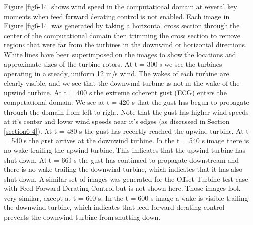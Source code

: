 Figure \ref{fig6-14} shows wind speed in the computational domain at several key moments when feed forward derating control is not enabled. Each image in Figure \ref{fig6-14} was generated by taking a horizontal cross section through the center of the computational domain then trimming the cross section to remove regions that were far from the turbines in the downwind or horizontal directions. White lines have been superimposed on the images to show the locations and approximate sizes of the turbine rotors. At t = 300 s we see the turbines operating in a steady, uniform 12 m/s wind. The wakes of each turbine are clearly visible, and we see that the downwind turbine is not in the wake of the upwind turbine. At t = 400 s the extreme coherent gust (ECG) enters the computational domain. We see at t = 420 s that the gust has begun to propagate through the domain from left to right. Note that the gust has higher wind speeds at it's center and lower wind speeds near it's edges (as discussed in Section \ref{section6-4}). At t = 480 s the gust has recently reached the upwind turbine. At t = 540 s the gust arrives at the downwind turbine. In the t = 540 s image there is no wake trailing the upwind turbine. This indicates that the upwind turbine has shut down. At t = 660 s the gust has continued to propagate downstream and there is no wake trailing the downwind turbine, which indicates that it has also shut down. A similar set of images was generated for the Offset Turbine test case with Feed Forward Derating Control but is not shown here. Those images look very similar, except at t = 600 s. In the t = 600 s image a wake is visible trailing the downwind turbine, which indicates that feed forward derating control prevents the downwind turbine from shutting down.

